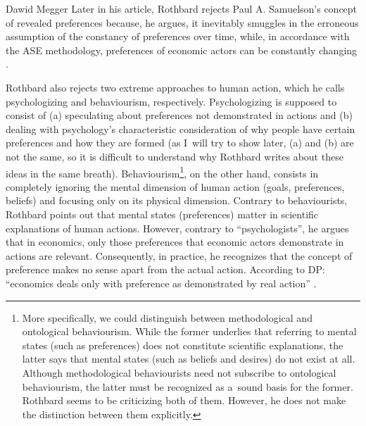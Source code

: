 \begin{artengenv}{Dawid Megger}
Later in his article, Rothbard rejects Paul A. Samuelson's concept of revealed preferences because, he argues, it inevitably smuggles in the erroneous assumption of the constancy of preferences over time, while, in accordance with the ASE methodology, preferences of economic actors can be constantly changing 
\parencite[][p.294]{rothbard_present_2011}.%




Rothbard also rejects two extreme approaches to human action, which he calls psychologizing and behaviourism, respectively. Psychologizing is supposed to consist of (a) speculating about preferences not demonstrated in actions and (b) dealing with psychology's characteristic consideration of why people have certain preferences and how they are formed (as I~will try to show later, (a) and (b) are not the same, so it is difficult to understand why Rothbard writes about these ideas in the same breath). Behaviourism\footnote{More specifically, we could distinguish between methodological and ontological behaviourism. While the former underlies that referring to mental states (such as preferences) does not constitute scientific explanations, the latter says that mental states (such as beliefs and desires) do not exist at all. Although methodological behaviourists need not subscribe to ontological behaviourism, the latter must be recognized as a~sound basis for the former. Rothbard 
\parencite*[][p.297]{rothbard_present_2011} %
 seems to be criticizing both of them. However, he does not make the distinction between them explicitly.}, on the other hand, consists in completely ignoring the mental dimension of human action (goals, preferences, beliefs) and focusing only on its physical dimension. Contrary to behaviourists, Rothbard points out that mental states (preferences) matter in scientific explanations of human actions. However, contrary to ``psychologists'', he argues that in economics, only those preferences that economic actors demonstrate in actions are relevant. Consequently, in practice, he recognizes that the concept of preference makes no sense apart from the actual action. According to DP: ``economics deals only with preference as demonstrated by real action'' 
\parencite[][p.333]{rothbard_present_2011}.%





\end{artengenv}
